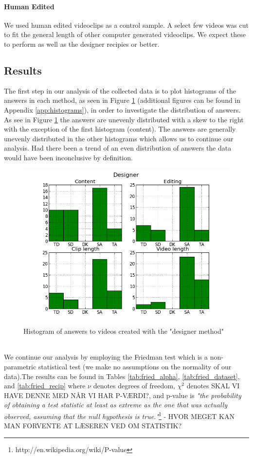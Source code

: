 \paragraph{Human Edited}
% 
We used human edited videoclips as a control sample. A select few videos was cut to fit the general length of other computer generated videoclips.
%
%
We expect these to perform as well as the designer recipies or better.
%
\subsection{Results}
%
The first step in our analysis of the collected data is to plot histograms of the answers in each method, as seen in Figure \ref{fig:hist_design} (additional figures can be found in Appendix \ref{app:histograms}), in order to investigate the distribution of answers. As see in Figure \ref{fig:hist_design} the answers are unevenly distributed with a skew to the right with the exception of the first histogram (content). The answers are generally unevenly distributed in the other histograms which allows us to continue our analysis. Had there been a trend of an even distribution of answers the data would have been inconclusive by definition.
%
\begin{figure}
     \centering
     \includegraphics[width=1.0\textwidth]{img/designer_barplot.png}
     \caption{Histogram of answers to videos created with the "designer method"}\label{fig:hist_design}
\end{figure}\\
%
We continue our analysis by employing the Friedman test which is a non-parametric statistical test (we make no assumptions on the normality of our data).The results can be found in Tables \ref{tab:fried_alpha}, \ref{tab:fried_dataset}, and \ref{tab:fried_recip} where $\nu$ denotes degrees of freedom, $\chi^2$ denotes SKAL VI HAVE DENNE MED NÅR VI HAR P-VÆRDI?, and p-value is \textit{"the probability of obtaining a test statistic at least as extreme as the one that was actually observed, assuming that the null hypothesis is true."}\footnote{http://en.wikipedia.org/wiki/P-value} - HVOR MEGET KAN MAN FORVENTE AT LÆSEREN VED OM STATISTIK?\\
